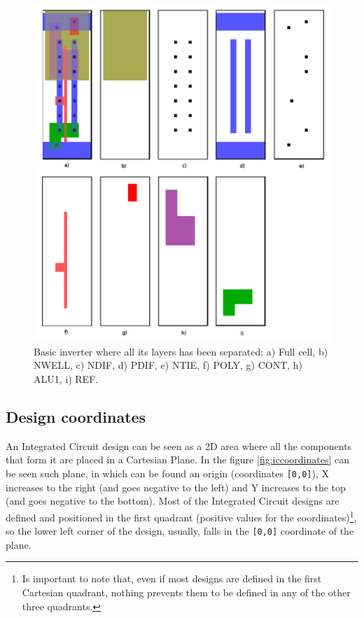\documentclass[11pt,twoside,openany,x11names,svgnames]{memoir}
\begin{document}
\begin{figure}
	\centering
	\label{fig:layers}
	\includegraphics[scale=0.2, clip=true, trim= 0pt 0pt 0pt 0pt]{images/chapter03-image01}
	\caption{Basic inverter where all its layers has been separated: a) Full cell, b) NWELL, c) NDIF, d) PDIF, e) NTIE, f) POLY, g) CONT, h) ALU1, i) REF.}
\end{figure}

\subsection{Design coordinates}\label{Design-coordinates}

An Integrated Circuit design can be seen as a 2D area where all the components that form it are placed in a Cartesian Plane. In the figure \ref{fig:iccoordinates} can be seen such plane, in which can be found an origin (coordinates \texttt{[0,0]}), X increases to the right (and goes negative to the left) and Y increases to the top (and goes negative to the bottom). Most of the Integrated Circuit designs are defined and positioned in the first quadrant (positive values for the coordinates)\footnote{Is important to note that, even if most designs are defined in the first Cartesian quadrant, nothing prevents them to be defined in any of the other three quadrants.}, so the lower left corner of the design, usually, falls in the \texttt{[0,0]} coordinate of the plane.
\end{document}

